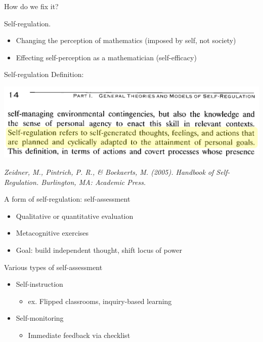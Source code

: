 \documentclass{beamer}
\begin{document}
\begin{frame}
  How do we fix it?
\end{frame}
\begin{frame}
  Self-regulation.\pause
  \begin{itemize}
    \item Changing the perception of mathematics (imposed by self, not society)
    \item Effecting self-perception as a mathematician (self-efficacy)
  \end{itemize}
\end{frame}
\begin{frame}{Self-regulation}
  Definition:
  \begin{center}
    \includegraphics[scale=0.4]{selfregdef}
  \end{center}
  \hfill \begin{minipage}[]{7cm}
      \emph{\tiny Zeidner, M., Pintrich, P. R., \& Boekaerts, M. (2005). Handbook of Self-Regulation. Burlington, MA: Academic Press.}
\end{minipage}
\end{frame}
\begin{frame}{A form of self-regulation: self-assessment}
  \begin{itemize}
    \item Qualitative or quantitative evaluation
    \item Metacognitive exercises
    \item Goal: build independent thought, shift locus of power
  \end{itemize}
\end{frame}
\begin{frame}{Various types of self-assessment}
  \begin{itemize}
    \item Self-instruction
    \begin{itemize}
      \item ex. Flipped classrooms, inquiry-based learning
    \end{itemize}
    \item Self-monitoring
    \begin{itemize}
      \item Immediate feedback via checklist
    \end{itemize}
  \end{itemize}
\end{frame}
\end{document}
